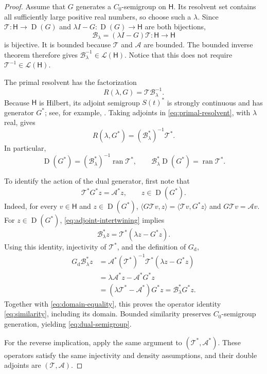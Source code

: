 \documentclass[11pt,a4paper]{article}
\newcommand{\StateSpace}{\mathsf H}
\newcommand{\OpT}{\mathcal T}
\newcommand{\OpA}{\mathcal A}
\newcommand{\OpB}{\mathcal B_\lambda}
\DeclareMathOperator{\ran}{ran}
\DeclareMathOperator{\Dom}{D}
\begin{document}
\begin{proof}
Assume that $G$ generates a $C_0$-semigroup on $\StateSpace$.
Its resolvent set contains all sufficiently large positive real numbers,
so choose such a $\lambda$.
Since $\OpT:\StateSpace\to\Dom(G)$ and
$\lambda I-G:\Dom(G)\to\StateSpace$ are both bijections,
\[
 \OpB=(\lambda I-G)\OpT:\StateSpace\to\StateSpace
\]
is bijective. It is bounded because $\OpT$ and $\OpA$ are bounded.
The bounded inverse theorem therefore gives
$\OpB^{-1}\in\mathcal L(\StateSpace)$. Notice that this does not require
$\OpT^{-1}\in\mathcal L(\StateSpace)$.

The primal resolvent has the factorization
\begin{equation}\label{eq:primal-resolvent}
 R(\lambda,G)=\OpT\OpB^{-1}.
\end{equation}
Because $\StateSpace$ is Hilbert, its adjoint semigroup $S(t)^*$ is strongly
continuous and has generator $G^*$; see, for example,
\cite[p.~67]{raymond}. Taking adjoints in
\eqref{eq:primal-resolvent}, with $\lambda$ real, gives
\begin{equation}\label{eq:adjoint-resolvent}
 R(\lambda,G^*)=(\OpB^*)^{-1}\OpT^*.
\end{equation}
In particular,
\begin{equation}\label{eq:domain-equality}
 \Dom(G^*)=(\OpB^*)^{-1}\ran\OpT^*,
 \qquad
 \OpB^*\Dom(G^*)=\ran\OpT^*.
\end{equation}

To identify the action of the dual generator, first note that
\begin{equation}\label{eq:adjoint-intertwining}
 \OpT^*G^*z=\OpA^*z,\qquad z\in\Dom(G^*).
\end{equation}
Indeed, for every $v\in\StateSpace$ and $z\in\Dom(G^*)$,
$\langle G\OpT v,z\rangle=\langle\OpT v,G^*z\rangle$
and $G\OpT v=\OpA v$.
For $z\in\Dom(G^*)$, \eqref{eq:adjoint-intertwining} implies
\[
 \OpB^*z=\OpT^*(\lambda z-G^*z).
\]
Using this identity, injectivity of $\OpT^*$, and the definition of
$G_{\mathrm d}$,
\begin{align*}
 G_{\mathrm d}\OpB^*z
 &=\OpA^*(\OpT^*)^{-1}\OpT^*(\lambda z-G^*z)\\
 &=\lambda\OpA^*z-\OpA^*G^*z\\
 &=(\lambda\OpT^*-\OpA^*)G^*z
 =\OpB^*G^*z.
\end{align*}
Together with \eqref{eq:domain-equality}, this proves the operator
identity \eqref{eq:similarity}, including its domain.
Bounded similarity preserves $C_0$-semigroup generation, yielding
\eqref{eq:dual-semigroup}.

For the reverse implication, apply the same argument to
$(\OpT^*,\OpA^*)$. These operators satisfy the same injectivity and
density assumptions, and their double adjoints are $(\OpT,\OpA)$.
\end{proof}
\end{document}
